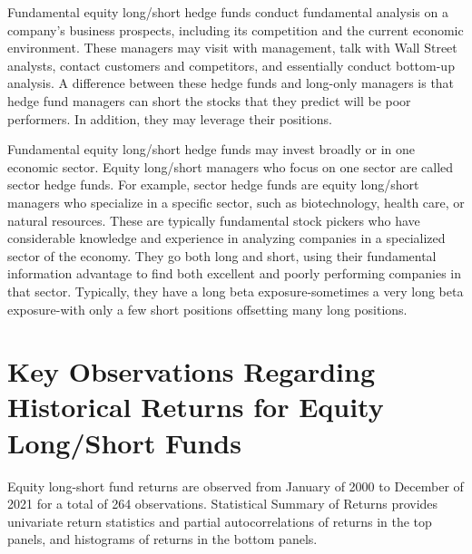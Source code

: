 \documentclass[11pt]{article}
\begin{document}
Fundamental equity long/short hedge funds conduct fundamental analysis on a company's business prospects, including its competition and the current economic environment. These managers may visit with management, talk with Wall Street analysts, contact customers and competitors, and essentially conduct bottom-up analysis. A difference between these hedge funds and long-only managers is that hedge fund managers can short the stocks that they predict will be poor performers. In addition, they may leverage their positions.

Fundamental equity long/short hedge funds may invest broadly or in one economic sector. Equity long/short managers who focus on one sector are called sector hedge funds. For example, sector hedge funds are equity long/short managers who specialize in a specific sector, such as biotechnology, health care, or natural resources. These are typically fundamental stock pickers who have considerable knowledge and experience in analyzing companies in a specialized sector of the economy. They go both long and short, using their fundamental information advantage to find both excellent and poorly performing companies in that sector. Typically, they have a long beta exposure-sometimes a very long beta exposure-with only a few short positions offsetting many long positions.

\section*{Key Observations Regarding Historical Returns for Equity Long/Short Funds}
Equity long-short fund returns are observed from January of 2000 to December of 2021 for a total of 264 observations. Statistical Summary of Returns provides univariate return statistics and partial autocorrelations of returns in the top panels, and histograms of returns in the bottom panels.
\end{document}

